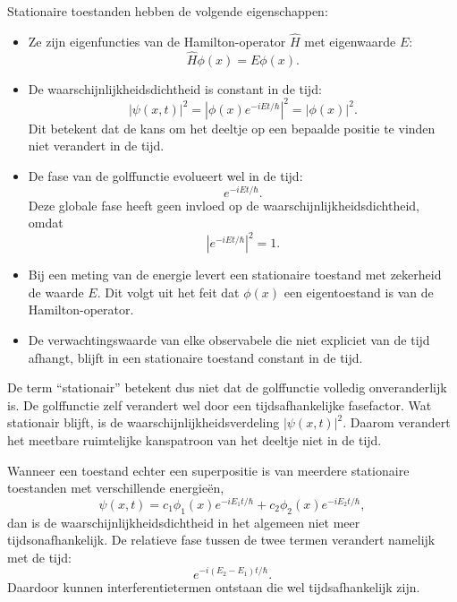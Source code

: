 \documentclass{report} %
\begin{document}
    Stationaire toestanden hebben de volgende eigenschappen:
    \begin{itemize}
        \item Ze zijn eigenfuncties van de Hamilton-operator \(\hat{H}\) met
        eigenwaarde \(E\):
        \[
            \hat{H}\phi(x)=E\phi(x).
        \]

        \item De waarschijnlijkheidsdichtheid is constant in de tijd:
        \[
            |\psi(x,t)|^2
            =
            |\phi(x)e^{-iEt/\hbar}|^2
            =
            |\phi(x)|^2.
        \]
        Dit betekent dat de kans om het deeltje op een bepaalde positie te vinden
        niet verandert in de tijd.

        \item De fase van de golffunctie evolueert wel in de tijd:
        \[
            e^{-iEt/\hbar}.
        \]
        Deze globale fase heeft geen invloed op de waarschijnlijkheidsdichtheid,
        omdat
        \[
            |e^{-iEt/\hbar}|^2=1.
        \]

        \item Bij een meting van de energie levert een stationaire toestand met
        zekerheid de waarde \(E\). Dit volgt uit het feit dat \(\phi(x)\) een
        eigentoestand is van de Hamilton-operator.

        \item De verwachtingswaarde van elke observabele die niet expliciet van de
        tijd afhangt, blijft in een stationaire toestand constant in de tijd.
    \end{itemize}
    De term ``stationair'' betekent dus niet dat de golffunctie volledig
    onveranderlijk is. De golffunctie zelf verandert wel door een tijdsafhankelijke
    fasefactor. Wat stationair blijft, is de waarschijnlijkheidsverdeling
    \(|\psi(x,t)|^2\). Daarom verandert het meetbare ruimtelijke kanspatroon van het
    deeltje niet in de tijd.

    Wanneer een toestand echter een superpositie is van meerdere stationaire
    toestanden met verschillende energieën,
    \[
        \psi(x,t)
        =
        c_1\phi_1(x)e^{-iE_1t/\hbar}
        +
        c_2\phi_2(x)e^{-iE_2t/\hbar},
    \]
    dan is de waarschijnlijkheidsdichtheid in het algemeen niet meer
    tijdsonafhankelijk. De relatieve fase tussen de twee termen verandert namelijk
    met de tijd:
    \[
        e^{-i(E_2-E_1)t/\hbar}.
    \]
    Daardoor kunnen interferentietermen ontstaan die wel tijdsafhankelijk zijn.
\end{document}
